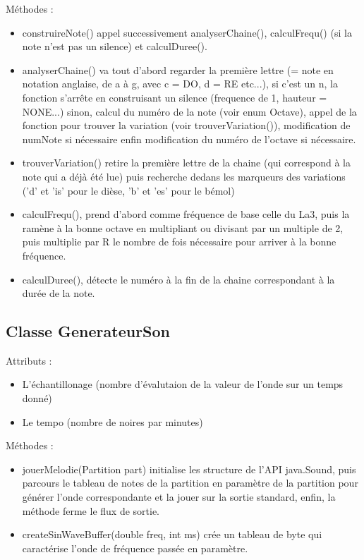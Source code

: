 \documentclass{EPUProjetPeiP}
\begin{document}
Méthodes :
\begin{itemize}
\item construireNote() appel successivement analyserChaine(), calculFrequ() (si la note n'est pas un silence) et calculDuree().
\item analyserChaine() va tout d'abord regarder la première lettre (= note en notation anglaise, de a à g, avec c = DO, d = RE etc...), si c'est un n, la fonction s'arrête en construisant un silence (frequence de 1, hauteur = NONE...) sinon, calcul du numéro de la note (voir enum Octave), appel de la fonction pour trouver la variation (voir trouverVariation()), modification de numNote si nécessaire enfin modification du numéro de l'octave si nécessaire.
\item trouverVariation() retire la première lettre de la chaine (qui correspond à la note qui a déjà été lue) puis recherche dedans les marqueurs des variations ('d' et 'is' pour le dièse, 'b' et 'es' pour le bémol)
\item calculFrequ(), prend d'abord comme fréquence de base celle du La3, puis la ramène à la bonne octave en multipliant ou divisant par un multiple de 2, puis multiplie par R le nombre de fois nécessaire pour arriver à la bonne fréquence.
\item calculDuree(), détecte le numéro à la fin de la chaine correspondant à la durée de la note.
\end{itemize}

\subsection{Classe GenerateurSon}

Attributs :
\begin{itemize}
\item L'échantillonage (nombre d'évalutaion de la valeur de l'onde sur un temps donné)
\item Le tempo (nombre de noires par minutes)
\end{itemize}

Méthodes :
\begin{itemize}
\item jouerMelodie(Partition part) initialise les structure de l'API java.Sound, puis parcours le tableau de notes de la partition en paramètre de la partition pour générer l'onde correspondante et la jouer sur la sortie standard, enfin, la méthode ferme le flux de sortie.
\item createSinWaveBuffer(double freq, int ms) crée un tableau de byte qui caractérise l'onde de fréquence passée en paramètre.
\end{itemize}
\end{document}
